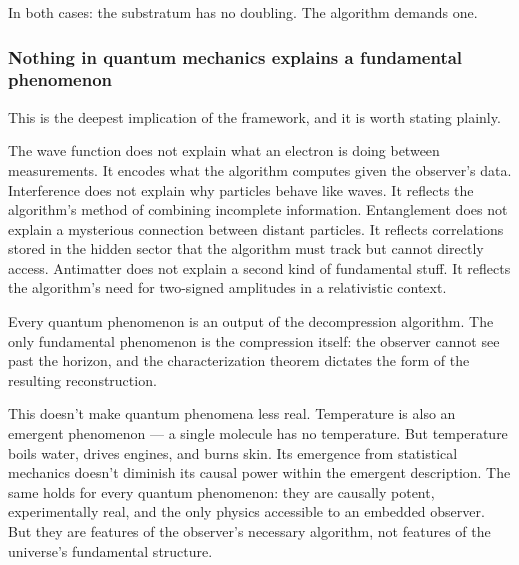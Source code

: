 \documentclass[
]{article}
\begin{document}
In both cases: the substratum has no doubling. The algorithm demands
one.

\hypertarget{nothing-in-quantum-mechanics-explains-a-fundamental-phenomenon}{%
\subsubsection{Nothing in quantum mechanics explains a fundamental
phenomenon}\label{nothing-in-quantum-mechanics-explains-a-fundamental-phenomenon}}

This is the deepest implication of the framework, and it is worth
stating plainly.

The wave function does not explain what an electron is doing between
measurements. It encodes what the algorithm computes given the
observer's data. Interference does not explain why particles behave like
waves. It reflects the algorithm's method of combining incomplete
information. Entanglement does not explain a mysterious connection
between distant particles. It reflects correlations stored in the hidden
sector that the algorithm must track but cannot directly access.
Antimatter does not explain a second kind of fundamental stuff. It
reflects the algorithm's need for two-signed amplitudes in a
relativistic context.

Every quantum phenomenon is an output of the decompression algorithm.
The only fundamental phenomenon is the compression itself: the observer
cannot see past the horizon, and the characterization theorem dictates
the form of the resulting reconstruction.

This doesn't make quantum phenomena less real. Temperature is also an
emergent phenomenon --- a single molecule has no temperature. But
temperature boils water, drives engines, and burns skin. Its emergence
from statistical mechanics doesn't diminish its causal power within the
emergent description. The same holds for every quantum phenomenon: they
are causally potent, experimentally real, and the only physics
accessible to an embedded observer. But they are features of the
observer's necessary algorithm, not features of the universe's
fundamental structure.
\end{document}

